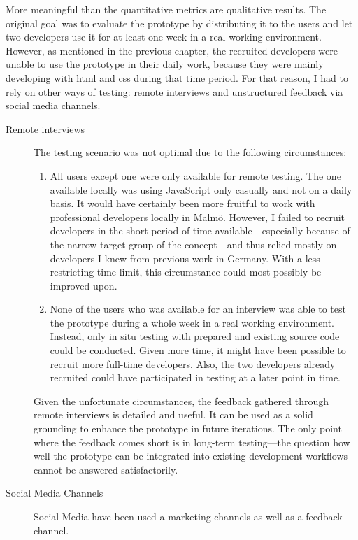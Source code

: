 More meaningful than the quantitative metrics are qualitative results.
The original goal was to evaluate the prototype by distributing it to
the users and let two developers use it for at least one week in a real
working environment. However, as mentioned in the previous chapter, the
recruited developers were unable to use the prototype in their daily
work, because they were mainly developing with \ac{html} and \ac{css}
during that time period. For that reason, I had to rely on other ways of
testing: remote interviews and unstructured feedback via social media
channels.

\begin{description}
\item[Remote interviews]
The testing scenario was not optimal due to the following circumstances:

\begin{enumerate}
\def\labelenumi{\arabic{enumi}.}
\itemsep1pt\parskip0pt
\item
  All users except one were only available for remote testing. The one
  available locally was using JavaScript only casually and not on a
  daily basis. It would have certainly been more fruitful to work with
  professional developers locally in Malmö. However, I failed to recruit
  developers in the short period of time available—especially because of
  the narrow target group of the concept—and thus relied mostly on
  developers I knew from previous work in Germany. With a less
  restricting time limit, this circumstance could most possibly be
  improved upon.
\item
  None of the users who was available for an interview was able to test
  the prototype during a whole week in a real working environment.
  Instead, only in situ testing with prepared and existing source code
  could be conducted. Given more time, it might have been possible to
  recruit more full-time developers. Also, the two developers already
  recruited could have participated in testing at a later point in time.
\end{enumerate}

Given the unfortunate circumstances, the feedback gathered through
remote interviews is detailed and useful. It can be used as a solid
grounding to enhance the prototype in future iterations. The only point
where the feedback comes short is in long-term testing—the question how
well the prototype can be integrated into existing development workflows
cannot be answered satisfactorily.
\item[Social Media Channels]
Social Media have been used a marketing channels as well as a feedback
channel.
\end{description}

